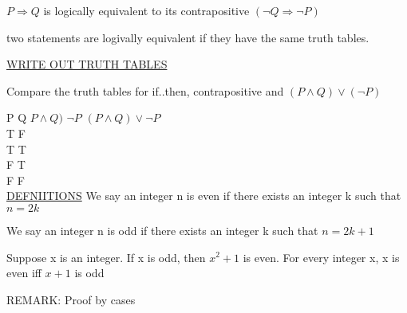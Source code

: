 \documentclass{report}
\begin{document}
\begin{itemize}
          $P \Longrightarrow Q$ is logically equivalent to its contrapositive $(\neg Q \Longrightarrow \neg P)$


      two statements are logivally equivalent if they have the same truth tables.

      \underline{WRITE OUT TRUTH TABLES}

      Compare the truth tables for if..then, contrapositive and $(P \wedge Q) \vee (\neg P)$

      P    Q   $P \wedge Q)$ $\neg P$      $(P \wedge Q) \vee \neg P$ \\
      T    F \\
      T    T \\
      F    T \\
      F    F \\

      \underline{DEFNIITIONS}
      We say an integer n is even if there exists an integer k such that $n = 2k$

      We say an integer n is odd if there exists an integer k such that $n = 2k+1$

       {
        Suppose x is an integer.  If x is odd, then $x^2 + 1$ is even. 
      }
       {
        For every integer x, x is even iff $x + 1$ is odd 
      }

      REMARK: Proof by cases

\end{itemize}
\end{document}

